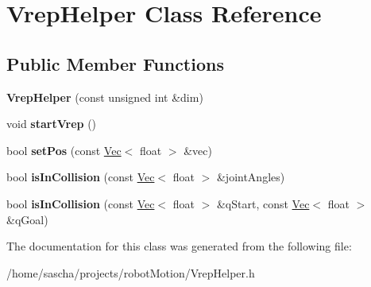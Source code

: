 \hypertarget{class_vrep_helper}{\section{Vrep\-Helper Class Reference}
\label{class_vrep_helper}
}
\subsection*{Public Member Functions}
\begin{DoxyCompactItemize}
\item 
\hypertarget{class_vrep_helper_a04371adb5eb40693aced9f7e1387fff0}{{\bfseries Vrep\-Helper} (const unsigned int \&dim)}\label{class_vrep_helper_a04371adb5eb40693aced9f7e1387fff0}

\item 
\hypertarget{class_vrep_helper_a348f7ee4507431d0b1e764bc89ac562b}{void {\bfseries start\-Vrep} ()}\label{class_vrep_helper_a348f7ee4507431d0b1e764bc89ac562b}

\item 
\hypertarget{class_vrep_helper_a9516941638afa6497f8a51dd6cbe51a9}{bool {\bfseries set\-Pos} (const \hyperlink{class_vec}{Vec}$<$ float $>$ \&vec)}\label{class_vrep_helper_a9516941638afa6497f8a51dd6cbe51a9}

\item 
\hypertarget{class_vrep_helper_ae1f1b0a52f7f9ed19449727c0de59b23}{bool {\bfseries is\-In\-Collision} (const \hyperlink{class_vec}{Vec}$<$ float $>$ \&joint\-Angles)}\label{class_vrep_helper_ae1f1b0a52f7f9ed19449727c0de59b23}

\item 
\hypertarget{class_vrep_helper_a4e9e500874996ff001bbaa5d9ef13d13}{bool {\bfseries is\-In\-Collision} (const \hyperlink{class_vec}{Vec}$<$ float $>$ \&q\-Start, const \hyperlink{class_vec}{Vec}$<$ float $>$ \&q\-Goal)}\label{class_vrep_helper_a4e9e500874996ff001bbaa5d9ef13d13}

\end{DoxyCompactItemize}


The documentation for this class was generated from the following file\-:\begin{DoxyCompactItemize}
\item 
/home/sascha/projects/robot\-Motion/Vrep\-Helper.\-h\end{DoxyCompactItemize}
